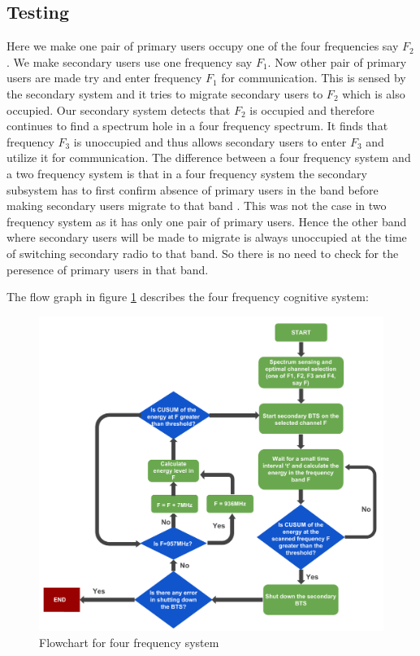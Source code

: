 \subsection{Testing}
Here we make one pair of primary users occupy one of the four frequencies say 
$F_2$. We make secondary users use one frequency say $F_1$. Now other pair of 
primary users are made try and enter frequency $F_1$ for communication. This is sensed by 
the secondary system and it tries to migrate secondary users to $F_2$ which is 
also occupied. Our secondary system detects that $F_2$ is occupied and therefore 
continues to find a spectrum hole in a four frequency spectrum. It finds that 
frequency $F_3$ is unoccupied and thus allows secondary users to enter $F_3$ 
and utilize it for communication. The difference between a four frequency 
system and a two frequency system is that in a four frequency 
system the secondary subsystem has to first confirm absence of primary users 
in the band before making secondary users migrate to that band . This was not
the case in two frequency system as it has only one 
pair of primary users. Hence the other band where secondary users will be made 
to migrate is always unoccupied at the time of switching secondary radio to 
that band. So there is no need to check for the peresence of primary users in that band.

The flow graph in figure \ref{freqSys4} describes the four frequency cognitive system:

\begin{figure}
\centering
\includegraphics[width=\textwidth]{freqSys4}
\caption[Four frequency system]{Flowchart for four frequency system}
\label{freqSys4}
\end{figure}

